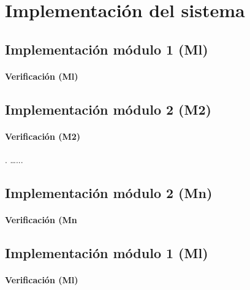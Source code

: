 \chapter{Implementación del sistema}
%
\section{Implementación módulo 1 (M{l})}

\subsubsection{Verificación (M{l})}


\section{Implementación módulo 2 (M{2})}

\subsubsection{Verificación (M{2})}


.  \dots ...
\section{Implementación módulo 2 (M{n})}

\subsubsection{Verificación (M{n}}


\section{Implementación módulo 1 (M{l})}

\subsubsection{Verificación (M{l})}





\endinput 